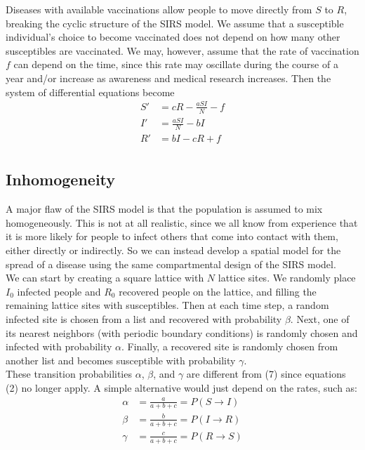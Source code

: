 \documentclass[prb,aps,twocolumn,showpacs,10pt]{revtex4-1}
\begin{document}
Diseases with available vaccinations allow people to move directly from $S$ to $R$, breaking the cyclic structure of the SIRS model. We assume that a susceptible individual's choice to become vaccinated does not depend on how many other susceptibles are vaccinated. We may, however, assume that the rate of vaccination $f$ can depend on the time, since this rate may oscillate during the course of a year and/or increase as awareness and medical research increases. Then the system of differential equations become
\begin{equation}
\begin{split}
S'&=cR-\frac{aSI}{N}-f\\
I'&=\frac{aSI}{N}-bI\\
R'&=bI-cR+f\\
\end{split}
\end{equation}

\subsection{Inhomogeneity}

A major flaw of the SIRS model is that the population is assumed to mix homogeneously. This is not at all realistic, since we all know from experience that it is more likely for people to infect others that come into contact with them, either directly or indirectly. So we can instead develop a spatial model for the spread of a disease using the same compartmental design of the SIRS model. \\

We can start by creating a square lattice with $N$ lattice sites. We randomly place $I_0$ infected people and $R_0$ recovered people on the lattice, and filling the remaining lattice sites with susceptibles. Then at each time step, a random infected site is chosen from a list and recovered with probability $\beta$. Next, one of its nearest neighbors (with periodic boundary conditions) is randomly chosen and infected with probability $\alpha$. Finally, a recovered site is randomly chosen from another list and becomes susceptible with probability $\gamma$.\\

These transition probabilities $\alpha$, $\beta$, and $\gamma$ are different from (7) since equations (2) no longer apply. A simple alternative would just depend on the rates, such as:
\begin{equation}
\begin{split}
\alpha &= \frac{a}{a+b+c} = P(S\rightarrow I)\\
\beta &= \frac{b}{a+b+c} = P(I\rightarrow R)\\
\gamma &= \frac{c}{a+b+c} = P(R\rightarrow S)\\
\end{split}
\end{equation}
\end{document}
